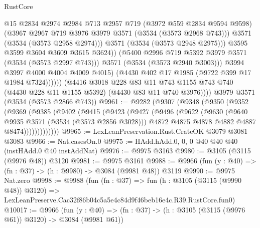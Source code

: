 \begin{lexlean}{RustCore}
\begin{coremodule}
                            @15
                            @2834
                            @2974
                            @2984
                            @713
                            @2957
                            @719
                            (@3972 @559 @2834 @9594 @9598)
                            (@3967 @2967 @719 @3976 @3979 @3571 (@3534 (@3573 @2968 @743)))
                            @3571
                            (@3534 (@3573 @2958 @2974)))
                          @3571
                          (@3534 (@3573 @2948 @2975)))
                        @3595
                        @3599
                        @3604
                        @3609
                        @3615
                        @3624))
                    (@5400 @2996 @719 @5392 @3979 @3571 (@3534 (@3573 @2997 @743)))
                    @3571
                    (@3534 (@3573 @2940 @3003)))
                  @3994
                  @3997
                  @4000
                  @4004
                  @4009
                  @4015)
                (@4430 @402 @17 @1985 (@9722 @399 @17 @1984 @7324))))))
        (@4416
          @3018
          @228
          @83
          @11
          @743
          @1155
          @743
          @740
          (@4430 @228 @11 @1155 @5392)
          (@4430 @83 @11 @740 @3976))))
    @3979
    @3571
    (@3534 (@3573 @2866 @743))
@9961 := @9282
    (@9307
      (@9348
        (@9350
          (@9352
            (@9369
              (@9385
                (@9402
                  (@9415
                    (@9423
                      (@9427
                        (@9496
                          (@9622
                            (@9630
                              (@9640 @9935 @3571 (@3534 (@3573 @2856 @3028)))
                              @4872
                              @4875
                              @4878
                              @4882
                              @4887
                              @8474)))))))))))))
@9965 := LexLeanPreservation.Rust.CrateOK @3079 @3081 @3083
@9966 := Nat.casesOn.{0}
@9975 := HAdd.hAdd.{0, 0, 0} @40 @40 @40 (instHAdd.{0} @40 instAddNat)
@9976 := @9975 @3163
@9980 := @3105 (@3115 (@9976 @48)) @3120
@9981 := @9975 @3161
@9988 := @9966 (fun (y : @40) => (fn : @37) -> (h : @9980) -> @3084 (@9981 @48)) @3119
@9990 := @9975 Nat.zero
@9998 := @9988
    (fun (fn : @37) =>
    fun (h : @3105 (@3115 (@9990 @48)) @3120) =>
    LexLeanPreserve.Cac32f86b04c5a5e4c84d9f46beb16e4c.R39.RustCore.fun0)
@10017 := @9966
    (fun (y : @40) => (fn : @37) -> (h : @3105 (@3115 (@9976 @61)) @3120) -> @3084 (@9981 @61))

\end{coremodule}
\end{lexlean}
